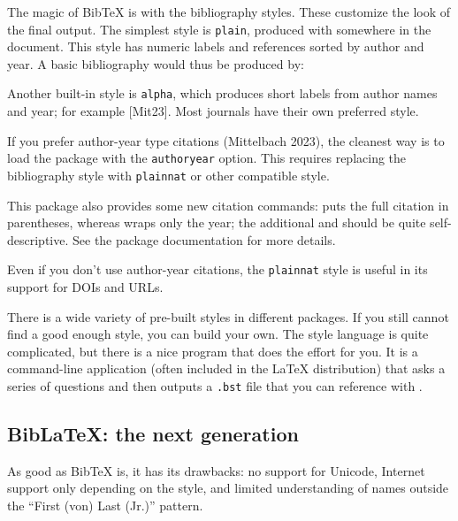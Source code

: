 The magic of BibTeX is with the bibliography styles.
These customize the look of the final output.
The simplest style is \verb|plain|, produced with \verb||
somewhere in the document.
This style has numeric labels and references sorted by author and year.
A basic bibliography would thus be produced by:
\begin{ExampleCode}


\end{ExampleCode}

Another built-in style is \verb|alpha|,
which produces short labels from author names and year;
for example [Mit23].
Most journals have their own preferred style.

If you prefer author-year type citations (Mittelbach 2023),
the cleanest way is to load the package  with the \verb|authoryear| option.
This requires replacing the bibliography style with \verb|plainnat| or other compatible style.

This package also provides some new citation commands:
 puts the full citation in parentheses, whereas  wraps only the year;
the additional  and  should be quite self-descriptive.
See the package documentation for more details.

\begin{practices}
Even if you don't use author-year citations,
the \verb|plainnat| style is useful in its support for DOIs and URLs.
\end{practices}

There is a wide variety of pre-built styles in different packages.
If you still cannot find a good enough style,
you can build your own.
The style language is quite complicated, but there is a nice  program
that does the effort for you.
It is a command-line application (often included in the \LaTeX{} distribution)
that asks a series of questions and then outputs a \verb|.bst| file
that you can reference with .



%
\subsection{BibLaTeX: the next generation}

As good as BibTeX is, it has its drawbacks:
no support for Unicode, Internet support only depending on the style,
and limited understanding of names outside the ``First (von) Last (Jr.)'' pattern.


